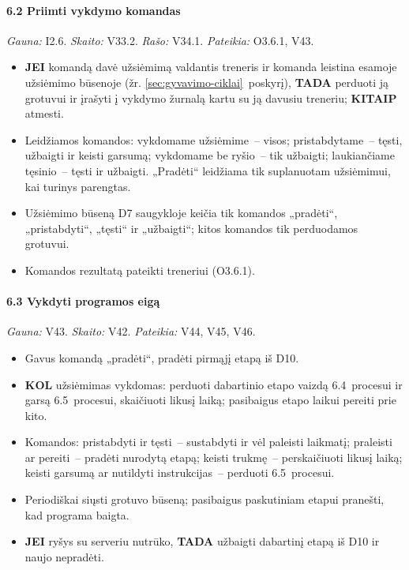 \paragraph{6.2 Priimti vykdymo komandas}\mbox{}\par
{\small \textit{Gauna:} I2.6. \textit{Skaito:} V33.2. \textit{Rašo:} V34.1. \textit{Pateikia:} O3.6.1, V43.}
\begin{itemize}
  \item \textbf{JEI} komandą davė užsiėmimą valdantis treneris ir komanda leistina esamoje užsiėmimo būsenoje (žr. \ref{sec:gyvavimo-ciklai}~poskyrį), \textbf{TADA} perduoti ją grotuvui ir įrašyti į vykdymo žurnalą kartu su ją davusiu treneriu; \textbf{KITAIP} atmesti.
  \item Leidžiamos komandos: vykdomame užsiėmime~– visos; pristabdytame~– tęsti, užbaigti ir keisti garsumą; vykdomame be ryšio~– tik užbaigti; laukiančiame tęsinio~– tęsti ir užbaigti. „Pradėti“ leidžiama tik suplanuotam užsiėmimui, kai turinys parengtas.
  \item Užsiėmimo būseną D7 saugykloje keičia tik komandos „pradėti“, „pristabdyti“, „tęsti“ ir „užbaigti“; kitos komandos tik perduodamos grotuvui.
  \item Komandos rezultatą pateikti treneriui (O3.6.1).
\end{itemize}
\paragraph{6.3 Vykdyti programos eigą}\mbox{}\par
{\small \textit{Gauna:} V43. \textit{Skaito:} V42. \textit{Pateikia:} V44, V45, V46.}
\begin{itemize}
  \item Gavus komandą „pradėti“, pradėti pirmąjį etapą iš D10.
  \item \textbf{KOL} užsiėmimas vykdomas: perduoti dabartinio etapo vaizdą 6.4~procesui ir garsą 6.5~procesui, skaičiuoti likusį laiką; pasibaigus etapo laikui pereiti prie kito.
  \item Komandos: pristabdyti ir tęsti~– sustabdyti ir vėl paleisti laikmatį; praleisti ar pereiti~– pradėti nurodytą etapą; keisti trukmę~– perskaičiuoti likusį laiką; keisti garsumą ar nutildyti instrukcijas~– perduoti 6.5~procesui.
  \item Periodiškai siųsti grotuvo būseną; pasibaigus paskutiniam etapui pranešti, kad programa baigta.
  \item \textbf{JEI} ryšys su serveriu nutrūko, \textbf{TADA} užbaigti dabartinį etapą iš D10 ir naujo nepradėti.
\end{itemize}
